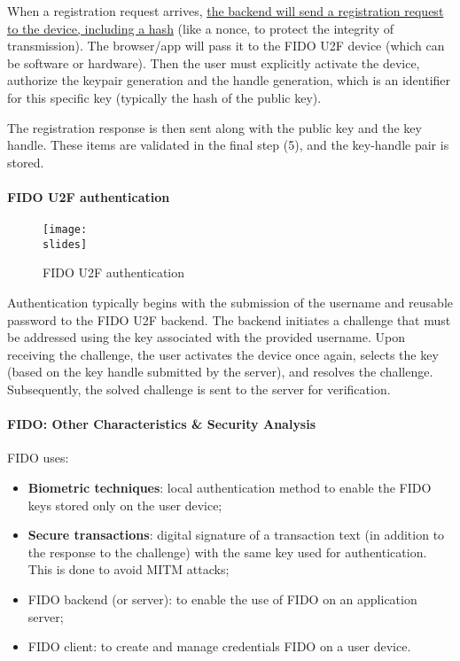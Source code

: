When a registration request arrives, \ul{the backend will send a registration request to the device, including a hash} (like a nonce, to protect the integrity of transmission). The browser/app will pass it to the FIDO U2F device (which can be software or hardware). Then the user must explicitly activate the device, authorize the keypair generation and the handle generation, which is an identifier for this specific key (typically the hash of the public key).

The registration response is then sent along with the public key and the key handle. These items are validated in the final step (5), and the key-handle pair is stored.


\paragraph*{FIDO U2F authentication}

\begin{figure}[h]
  \centering
  \texttt{[image: \\slides]}
  \caption{FIDO U2F authentication}
\end{figure}
Authentication typically begins with the submission of the username and reusable password to the FIDO U2F backend. The backend initiates a challenge that must be addressed using the key associated with the provided username. Upon receiving the challenge, the user activates the device once again, selects the key (based on the key handle submitted by the server), and resolves the challenge. Subsequently, the solved challenge is sent to the server for verification.


\paragraph*{FIDO: Other Characteristics \& Security Analysis}

FIDO uses:
\begin{itemize}
  \item \textbf{Biometric techniques}: local authentication method to enable the FIDO keys stored only on the user device;
  \item \textbf{Secure transactions}: digital signature of a transaction text (in addition to the response to the challenge) with the same key used for authentication. This is done to avoid MITM attacks;
  \item FIDO backend (or server): to enable the use of FIDO on an application server;
  \item FIDO client: to create and manage credentials FIDO on a user device.
\end{itemize}

